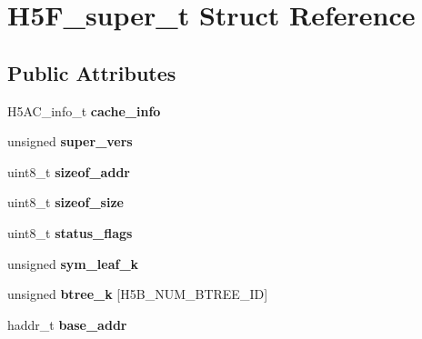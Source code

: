 \hypertarget{struct_h5_f__super__t}{}\section{H5\+F\+\_\+super\+\_\+t Struct Reference}
\label{struct_h5_f__super__t}
\subsection*{Public Attributes}
\begin{DoxyCompactItemize}
\item 
\mbox{\label{struct_h5_f__super__t_aa3b7605a7b9f4e1a300842e7d5ae793f}} 
H5\+A\+C\+\_\+info\+\_\+t {\bfseries cache\+\_\+info}
\item 
\mbox{\label{struct_h5_f__super__t_af7aba3a6c4ffe77b7137354d16ca651b}} 
unsigned {\bfseries super\+\_\+vers}
\item 
\mbox{\label{struct_h5_f__super__t_a780bc291b04db80cc7d8bcafbd749f25}} 
uint8\+\_\+t {\bfseries sizeof\+\_\+addr}
\item 
\mbox{\label{struct_h5_f__super__t_a24c7200558895201042946c16b8512cc}} 
uint8\+\_\+t {\bfseries sizeof\+\_\+size}
\item 
\mbox{\label{struct_h5_f__super__t_a812843339411e2120915236f75a43795}} 
uint8\+\_\+t {\bfseries status\+\_\+flags}
\item 
\mbox{\label{struct_h5_f__super__t_aafa18bf113ebd9341f5d85f3915e978b}} 
unsigned {\bfseries sym\+\_\+leaf\+\_\+k}
\item 
\mbox{\label{struct_h5_f__super__t_af64d72dfab3a1f7b889aee2d987a7f3f}} 
unsigned {\bfseries btree\+\_\+k} \mbox{[}H5\+B\+\_\+\+N\+U\+M\+\_\+\+B\+T\+R\+E\+E\+\_\+\+ID\mbox{]}
\item 
\mbox{\label{struct_h5_f__super__t_aecfb7bc0af5829dd65de967ea67612f7}} 
haddr\+\_\+t {\bfseries base\+\_\+addr}
\item 
\mbox{\label{struct_h5_f__super__t_ad36811e281b30f627c2fea86da03c611}} 

\end{DoxyCompactItemize}

